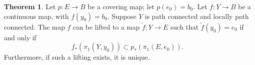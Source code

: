 \documentclass[12pt,a4paper]{book}
\newenvironment{prooff}{{\noindent\it\textcolor{cyan!40!black}{Proof}:}\,}{\par}
\theoremstyle{definition}
\newtheorem{theo}[defn]{Theorem}
\begin{document}
\begin{theo}
    Let $p: E \rightarrow B$ be a covering map; let $p\left(e_0\right)=b_0$. Let $f: Y \rightarrow B$ be a continuous map, with $f\left(y_0\right)=b_0$. Suppose $Y$ is path connected and locally path connected. The map $f$ can be lifted to a map $\tilde{f}: Y \rightarrow E$ such that $\tilde{f}\left(y_0\right)=e_0$ if and only if
    $$
        f_*\left(\pi_1\left(Y, y_0\right)\right) \subset p_*\left(\pi_1\left(E, e_0\right)\right) .
    $$
    Furthermore, if such a lifting exists, it is unique.
\end{theo}
\begin{prooff}






\end{prooff}
\end{document}

